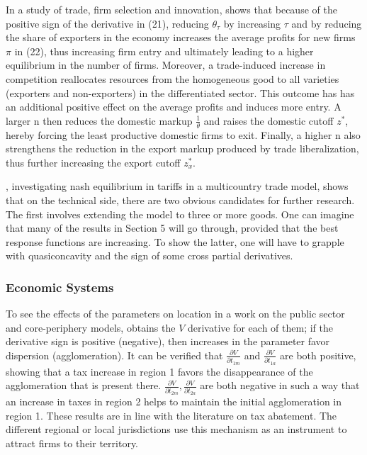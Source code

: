 \documentclass[11pt]{book}
\begin{document}
In a study of trade, firm selection and innovation, \cite{impullitti2018trade} shows that because of the positive sign of the
derivative in (21), reducing $\theta_{\tau}$ by increasing
$\tau$ and by reducing the share of exporters in the economy increases
the average profits for new firms $\pi$ in (22), thus increasing
firm entry and ultimately leading to a higher equilibrium in the number of firms.
Moreover, a trade-induced increase in competition reallocates resources
from the homogeneous good to all varieties (exporters and non-exporters)
in the differentiated sector. This outcome has has an additional positive effect
on the average profits and induces more entry. A larger n then reduces
the domestic markup $\frac{1}{\theta}$ and raises the domestic cutoff
$z^{*}$, hereby forcing the least productive domestic firms to exit.
Finally, a higher n also strengthens the reduction in the export markup
produced by trade liberalization, thus further increasing the export
cutoff $z_{x}^{*}$.

\cite{chattopadhyay2019nash}, investigating nash equilibrium in tariffs in a multicountry
trade model, shows that on the technical side, there are
two obvious candidates for further research. The first involves extending
the model to three or more goods. One can imagine that many of the
results in Section 5 will go through, provided that the best response
functions are increasing. To show the latter, one will have to grapple
with quasiconcavity and the sign of some cross partial derivatives.


\subsubsection{Economic Systems}

To see the effects of the parameters on location in a work on the public sector and
core-periphery models, \cite{lanaspa2001public}
obtains the $V$ derivative for each of them; if the derivative sign
is positive (negative), then increases in the parameter favor dispersion
(agglomeration). It can be verified that $\frac{\partial V}{\partial t_{1m}}$
and $\frac{\partial V}{\partial t_{1a}}$ are both positive, showing
that a tax increase in region 1 favors the disappearance of the agglomeration
that is present there. $\frac{\partial V}{\partial t_{2m}},\frac{\partial V}{\partial t_{2a}}$
are both negative in such a way that an increase in taxes in region
2 helps to maintain the initial agglomeration in region 1. These results
are in line with the literature on tax abatement. The different regional
or local jurisdictions use this mechanism as an instrument to attract
firms to their territory.
\end{document}
